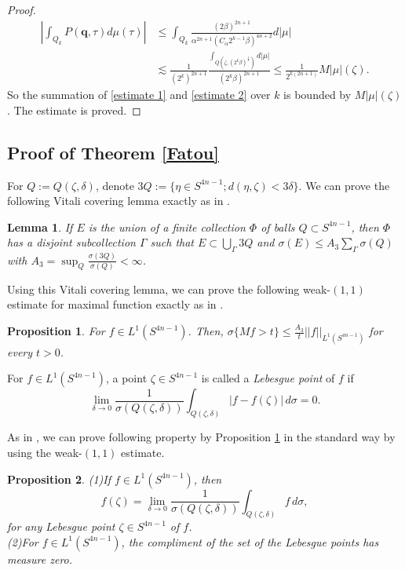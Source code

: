 \documentclass[a4paper,11pt]{amsart}
\numberwithin{equation}{section}
\newtheorem{lem}{Lemma}[section]
\newtheorem{prop}{Proposition}[section]
\begin{document}
\begin{proof}
\begin{equation}\begin{aligned}\label{estimate 2}
\left|\int_{Q_k}P(\mathbf{q},\tau)d\mu(\tau)\right|&\leq\int_{Q_k}\frac{(2\beta)^{2n+1}}{\alpha^{2n+1}(C_{\alpha}2^{k-1}\beta)^{4n+2}}d|\mu|\\
&\lesssim \frac{1}{(2^{k})^{2n+1}}\frac{\int_{Q(\zeta,(2^k\beta)^{\frac12})}d|\mu|}{(2^k\beta)^{2n+1}}\leq \frac{1}{2^{k(2n+1)}}M|\mu|(\zeta).
\end{aligned}\end{equation}
So the summation of \eqref{estimate 1} and \eqref{estimate 2} over $k$ is bounded by $M|\mu|(\zeta)$. The estimate is proved.
\end{proof}


\subsection{Proof of Theorem \ref{Fatou}}
For $Q:=Q(\zeta, \delta)$, denote $3Q:=\{\eta\in S^{4n-1};d(\eta,\zeta)<3\delta\}$.
We can prove the following Vitali covering lemma exactly as in \cite[lemma 5.2.3]{Rudin}.
\begin{lem}\label{vitali}
If $E$ is the union of a finite collection $\Phi$ of balls $Q \subset S^{4n-1}$, then
$\Phi$ has a disjoint subcollection $\Gamma$ such that $E \subset \bigcup_{\Gamma} 3Q$ and $\sigma(E) \leq A_3 \sum_{\Gamma} \sigma(Q)$ with $A_3=\sup_{Q}\frac{\sigma(3Q)}{\sigma(Q)}<\infty$.
\end{lem}
Using this Vitali covering lemma, we can prove the following weak-$(1,1)$ estimate for maximal function exactly as in \cite[theorem 5.2.4, theorem 5.2.7]{Rudin}.
\begin{prop}\label{lem A3}
For $f\in L^1(S^{4n-1})$. Then, $\sigma\{Mf>t\}\leq \frac{A_3}{t}||f||_{L^1(S^{4n-1})}$ for every $t>0$.
\end{prop}

For $f\in L^1(S^{4n-1})$, a point $\zeta\in S^{4n-1}$ is called a \emph{Lebesgue point} of $f$ if
\begin{equation}\label{eq:leb1}
\lim_{\delta \to 0} \frac{1}{\sigma(Q(\zeta,\delta))} \int_{Q(\zeta,\delta)} |f - f(\zeta)| \, d\sigma = 0.
\end{equation}

As in \cite{Rudin}, we can prove following property by Proposition \ref{lem A3} in the standard way by using the weak-$(1,1)$ estimate.
\begin{prop}\label{dense}
(1)\;If $f \in L^1(S^{4n-1})$, then
\begin{equation}
\label{eq:leb2}
f(\zeta) = \lim_{\delta \to 0} \frac{1}{\sigma(Q(\zeta,\delta))} \int_{Q(\zeta,\delta)} f \, d\sigma ,
\end{equation}
for any Lebesgue point $\zeta \in S^{4n-1}$ of $f$.\\
(2)\;For $f\in L^1(S^{4n-1})$, the compliment of the set of the Lebesgue points has measure zero.
\end{prop}
\end{document}
